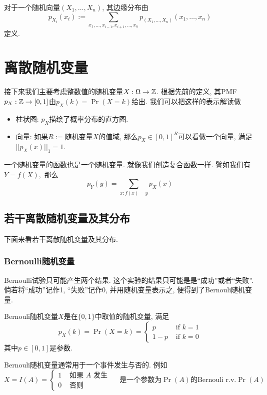 \documentclass{ctexart}
\begin{document}
\begin{definition}[边缘分布]
    对于一个随机向量$\left(X_1, \ldots, X_n\right)$, 其边缘分布由$$
p_{X_i}\left(x_i\right):=\sum_{x_1, \ldots, x_{i-1}, x_{i+1}, \ldots, x_n} p_{\left(X_1, \ldots, X_n\right)}\left(x_1, \ldots, x_n\right)
$$
定义. 

\end{definition}

\section{离散随机变量}

接下来我们主要考虑整数值的随机变量$X: \Omega \to {\mathbb Z}$. 根据先前的定义, 其PMF $p_X:{\mathbb Z}\to[0,1]$由$p_X(k)=\operatorname{Pr}(X=k)$给出. 我们可以把这样的表示解读做
\begin{itemize}
    \item 柱状图: $p_X$描绘了概率分布的直方图.
\item 向量: 如果$R:=$随机变量$X$的值域, 那么$p_X\in [0,1]^R$可以看做一个向量, 满足$||p_X(x)||_1=1$. 
\end{itemize}

一个随机变量的函数也是一个随机变量. 就像我们创造复合函数一样. 譬如我们有$Y=f(X),$ 那么$$
p_Y(y)=\sum_{x: f(x)=y} p_X(x)
$$
\subsection{若干离散随机变量及其分布} 下面来看若干离散随机变量及其分布. 

\subsubsection{Bernoulli随机变量} Bernoulli试验只可能产生两个结果. 这个实验的结果只可能是是``成功''或者``失败''. 倘若将``成功''记作1, ``失败''记作0, 并用随机变量表示之, 便得到了Bernouli随机变量. 

\begin{definition}[Bernouli随机变量]
    Bernouli随机变量$X$是在$\{ 0, 1 \}$中取值的随机变量, 满足
    $$
p_X(k)=\operatorname{Pr}(X=k)= \begin{cases}p & \text { if } k=1 \\ 1-p & \text { if } k=0\end{cases}
$$
其中$p\in [0,1]$是参数. 
\end{definition}

Bernouli随机变量通常用于一个事件发生与否的. 例如
$$
X=I(A)=\left\{\begin{array}{ll}
1 & \text { 如果 } A \text { 发生 } \\
0 & \text { 否则 }
\end{array} \quad \text {是一个参数为$\Pr(A)$的Bernouli r.v.} \operatorname{Pr}(A)\right.
$$
\end{document}

